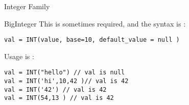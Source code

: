 \begin{section}{Integer Family}
\begin{subsection}{BigInteger}
This is sometimes required, and the syntax is :

\begin{lstlisting}[style=JexlStyle]
val = INT(value, base=10, default_value = null )
\end{lstlisting}

Usage is :

\begin{lstlisting}[style=JexlStyle]
val = INT("hello") // val is null
val = INT('hi',10,42 )// val is 42
val = INT('42') // val is 42 
val = INT(54,13 ) // val is 42 
\end{lstlisting}

\end{subsection}
\end{section}



